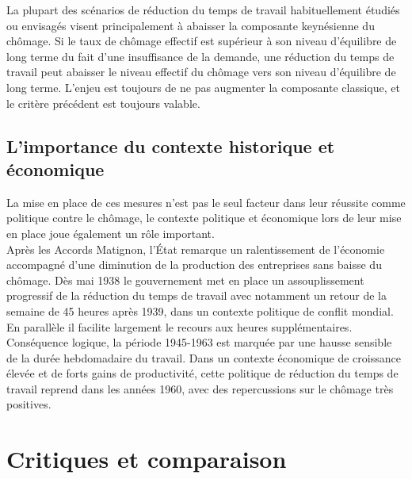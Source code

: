 \documentclass[main.tex]{subfiles}
\begin{document}
        La plupart des scénarios de réduction du temps de travail habituellement étudiés ou envisagés visent principalement à abaisser la composante keynésienne du chômage. Si le taux de chômage effectif est supérieur à son niveau d'équilibre de long terme du fait d'une insuffisance de la demande, une réduction du temps de travail peut abaisser le niveau effectif du chômage vers son niveau d'équilibre de long terme. L'enjeu est toujours de ne pas augmenter la composante classique, et le critère précédent est toujours valable.

        \subsection{L'importance du contexte historique et économique}

        La mise en place de ces mesures n'est pas le seul facteur dans leur réussite comme politique contre le chômage, le contexte politique et économique lors de leur mise en place joue également un rôle important. \\

        Après les Accords Matignon, l'État remarque un ralentissement de l'économie accompagné d'une diminution de la production des entreprises sans baisse du chômage. Dès mai 1938 le gouvernement met en place un assouplissement progressif de la réduction du temps de travail avec notamment un retour de la semaine de 45 heures après 1939, dans un contexte politique de conflit mondial. En parallèle il facilite largement le recours aux heures supplémentaires. Conséquence logique, la période 1945-1963 est marquée par une hausse sensible de la durée hebdomadaire du travail. Dans un contexte économique de croissance élevée et de forts gains de productivité, cette politique de réduction du temps de travail reprend dans les années 1960, avec des repercussions sur le chômage très positives.

\section{Critiques et comparaison}
\end{document}
